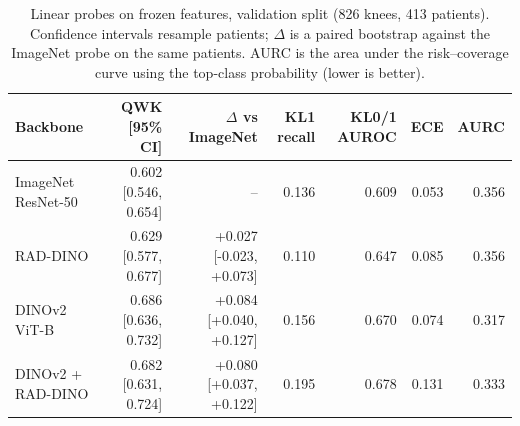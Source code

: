 \begin{table}[t]
\centering
\caption{Linear probes on frozen features, validation split (826 knees, 413 patients). Confidence intervals resample patients; $\Delta$ is a paired bootstrap against the ImageNet probe on the same patients. AURC is the area under the risk--coverage curve using the top-class probability (lower is better).}
\label{tab:main}
\footnotesize
\setlength{\tabcolsep}{3.5pt}
\begin{tabular}{lrrrrrr}
\toprule
Backbone & QWK [95\% CI] & $\Delta$ vs ImageNet & KL1 recall & KL0/1 AUROC & ECE & AURC \\
\midrule
ImageNet ResNet-50 & 0.602 [0.546, 0.654] & -- & 0.136 & 0.609 & 0.053 & 0.356 \\
RAD-DINO & 0.629 [0.577, 0.677] & +0.027 [-0.023, +0.073] & 0.110 & 0.647 & 0.085 & 0.356 \\
DINOv2 ViT-B & 0.686 [0.636, 0.732] & +0.084 [+0.040, +0.127] & 0.156 & 0.670 & 0.074 & 0.317 \\
DINOv2 + RAD-DINO & 0.682 [0.631, 0.724] & +0.080 [+0.037, +0.122] & 0.195 & 0.678 & 0.131 & 0.333 \\
\bottomrule
\end{tabular}
\end{table}
